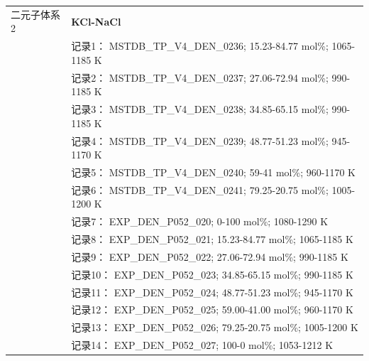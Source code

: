 \documentclass[12pt]{article}
\begin{document}
{\begin{longtable}[]{@{}
  >{\raggedright\arraybackslash}p{}
  >{\raggedright\arraybackslash}p{}@{}}
二元子体系 2  & \textbf{KCl-NaCl} \\
 & 记录1： MSTDB\_TP\_V4\_DEN\_0236; 15.23-84.77 mol\%; 1065-1185 K \\
 & 记录2： MSTDB\_TP\_V4\_DEN\_0237; 27.06-72.94 mol\%; 990-1185 K \\
 & 记录3： MSTDB\_TP\_V4\_DEN\_0238; 34.85-65.15 mol\%; 990-1185 K \\
 & 记录4： MSTDB\_TP\_V4\_DEN\_0239; 48.77-51.23 mol\%; 945-1170 K \\
 & 记录5： MSTDB\_TP\_V4\_DEN\_0240; 59-41 mol\%; 960-1170 K \\
 & 记录6： MSTDB\_TP\_V4\_DEN\_0241; 79.25-20.75 mol\%; 1005-1200 K \\
 & 记录7： EXP\_DEN\_P052\_020; 0-100 mol\%; 1080-1290 K \\
 & 记录8： EXP\_DEN\_P052\_021; 15.23-84.77 mol\%; 1065-1185 K \\
 & 记录9： EXP\_DEN\_P052\_022; 27.06-72.94 mol\%; 990-1185 K \\
 & 记录10： EXP\_DEN\_P052\_023; 34.85-65.15 mol\%; 990-1185 K \\
 & 记录11： EXP\_DEN\_P052\_024; 48.77-51.23 mol\%; 945-1170 K \\
 & 记录12： EXP\_DEN\_P052\_025; 59.00-41.00 mol\%; 960-1170 K \\
 & 记录13： EXP\_DEN\_P052\_026; 79.25-20.75 mol\%; 1005-1200 K \\
 & 记录14： EXP\_DEN\_P052\_027; 100-0 mol\%; 1053-1212 K  \\


\end{longtable}}
\end{document}
